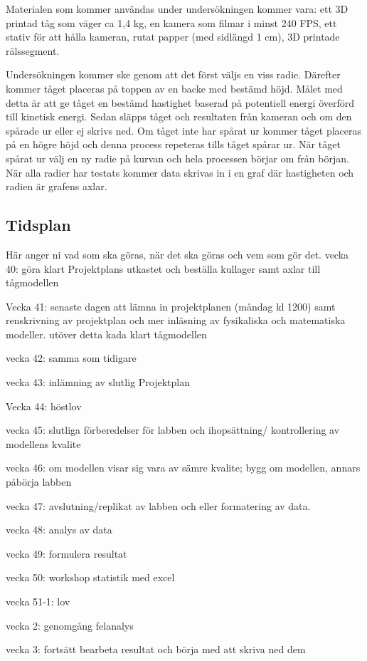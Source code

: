 Materialen som kommer användas under undersökningen kommer vara: ett 3D printad tåg som väger ca 1,4 kg, en kamera som filmar i minst 240 FPS, ett stativ för att hålla kameran, rutat papper (med sidlängd 1 cm), 3D printade rälssegment.

Undersökningen kommer ske genom att det först väljs en viss radie. Därefter kommer tåget placeras på toppen av en backe med bestämd höjd. Målet med detta är att ge tåget en bestämd hastighet baserad på potentiell energi överförd till kinetisk energi. Sedan släpps tåget och resultaten från kameran och om den spårade ur eller ej skrivs ned. Om tåget inte har spårat ur kommer tåget placeras på en högre höjd och denna process repeteras tills tåget spårar ur. När tåget spårat ur välj en ny radie på kurvan och hela processen börjar om från början. När alla radier har testats kommer data skrivas in i en graf där hastigheten och radien är grafens axlar.



\subsection{Tidsplan}
Här anger ni vad som ska göras, när det ska göras och vem som gör det.
vecka 40:
göra klart Projektplans utkastet och beställa kullager samt axlar till tågmodellen

Vecka 41: senaste dagen att lämna in projektplanen (måndag kl 1200) samt renskrivning av projektplan och mer inläsning av fysikaliska och matematiska modeller. utöver detta kada klart tågmodellen

vecka 42: samma som tidigare

vecka 43: inlämning av slutlig Projektplan

Vecka 44: höstlov

vecka 45: slutliga förberedelser för labben och ihopsättning/ kontrollering av modellens kvalite

vecka 46: om modellen visar sig vara av sämre kvalite; bygg om modellen, annars påbörja labben

vecka 47: avslutning/replikat av labben och eller formatering av data.

vecka 48: analys av data

vecka 49: formulera resultat

vecka 50: workshop statistik med excel

vecka 51-1: lov

vecka 2: genomgång felanalys

vecka 3: fortsätt bearbeta resultat och börja med att skriva ned dem

